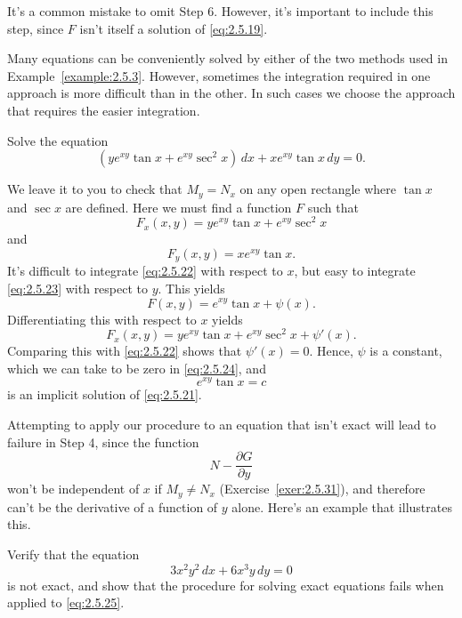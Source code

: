 It's a common mistake to omit Step 6. However, it's important to include this step, since $F$ isn't
itself a solution of \eqref{eq:2.5.19}.

Many equations can be conveniently solved by either of the two methods used in
Example~\ref{example:2.5.3}. However, sometimes the integration required in one approach is more
difficult than in the other. In such cases we choose the approach that requires the easier
integration.

\begin{example}
  \label{example:2.5.4} \rm Solve the equation
  \begin{equation}
    \label{eq:2.5.21}(ye^{xy}\tan x+e^{xy}\sec^{2}x)\,dx+xe^{xy}\tan x\,dy=0.
  \end{equation}
\end{example}

\begin{examplesolution}
\solution We leave it to you to check that $M_{y}=N_{x}$ on any open rectangle where $\tan x$ and
$\sec x$ are defined. Here we must find a function $F$ such that
\begin{equation}
  \label{eq:2.5.22}F_{x}(x,y)=ye^{xy}\tan x+e^{xy}\sec^{2}x
\end{equation}
and
\begin{equation}
  \label{eq:2.5.23}F_{y}(x,y)=xe^{xy}\tan x.
\end{equation}
It's difficult to integrate \eqref{eq:2.5.22} with respect to $x$, but easy to integrate
\eqref{eq:2.5.23} with respect to $y$. This yields
\begin{equation}
  \label{eq:2.5.24}F(x,y)=e^{xy}\tan x+\psi(x).
\end{equation}
Differentiating this with respect to $x$ yields
\[
  F_{x}(x,y)=ye^{xy}\tan x+e^{xy}\sec^{2}x+\psi'(x).
\]
Comparing this with \eqref{eq:2.5.22} shows that $\psi'(x)=0$. Hence, $\psi$ is a constant, which we
can take to be zero in \eqref{eq:2.5.24}, and
\[
  e^{xy}\tan x=c
\]
is an implicit solution of \eqref{eq:2.5.21}. \bbox
\end{examplesolution}

Attempting to apply our procedure to an equation that isn't exact will lead to failure in Step 4,
since the function
\[
  N-\frac{\partial G}{\partial y}
\]
won't be independent of $x$ if $M_{y}\ne N_{x}$ (Exercise~\ref{exer:2.5.31}), and therefore can't be
the derivative of a function of $y$ alone. Here's an example that illustrates this.

\begin{example}
  \label{example:2.5.5} \rm Verify that the equation
  \begin{equation}
    \label{eq:2.5.25}3x^{2}y^{2}\,dx+6x^{3}y\,dy=0
  \end{equation}
  is not exact, and show that the procedure for solving exact equations fails when applied to
  \eqref{eq:2.5.25}.
\end{example}

